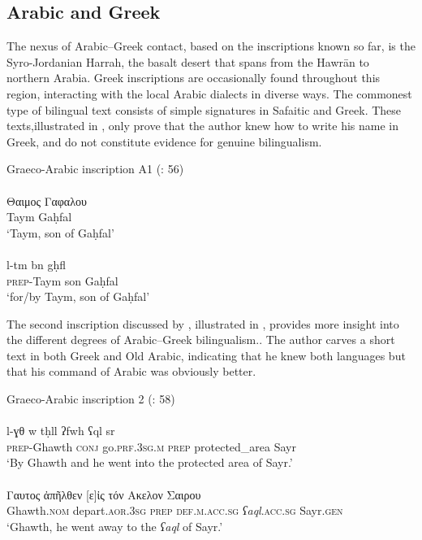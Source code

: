 \documentclass[output=paper]{langsci/langscibook}
\begin{document}
\subsection{Arabic and Greek}
The nexus of Arabic--Greek contact, based on the inscriptions known so far, is the Syro-Jordanian Harrah, the basalt desert that spans from the Hawrān to northern Arabia. Greek inscriptions are occasionally found throughout this region, interacting with the local Arabic dialects in diverse ways. The commonest type of bilingual text consists of simple signatures in Safaitic and Greek. These texts,\linebreak illustrated in , only prove that the author knew how to write his name in Greek, and do not constitute evidence for genuine bilingualism. 

\ea Graeco-Arabic inscription A1 (\citealt{Al-Jalladal-Manaser2016}: 56)\label{Taym}\\
 \\ 
\gll    Θαιμος Γαφαλου \\
        Taym Gaḥfal\\
\glt `Taym, son of Gaḥfal'\\

 \\
\gll   l-tm bn gḥfl \\
       \textsc{prep}-Taym son Gaḥfal \\
\glt `for/by Taym, son of Gaḥfal'\\
\z
\z

 The second inscription discussed by \citet{Al-Jalladal-Manaser2016}, illustrated in , provides more insight into the different degrees of Arabic--Greek bilingualism.. The author carves a short text in both Greek and Old Arabic, indicating that he knew both languages but that his command of Arabic was obviously better.

\ea Graeco-Arabic inscription 2 (\citealt{Al-Jalladal-Manaser2016}: 58)\label{Ghawth}\\
 \\
\gll   l-ɣθ w tḥll ʔfwh ʕql sr \\
       \textsc{prep}-Ghawth \textsc{conj} go.\textsc{prf.3sg.m} \textsc{prep} protected\_area Sayr\\
\glt `By Ghawth and he went into the protected area of Sayr.'\\
 \\ 
\gll    Γαυτος ἀπῆλθεν [ε]ἰς τόν Ακελον Σαιρου\\
Ghawth.\textsc{nom} depart.\textsc{aor.3sg} \textsc{prep} \textsc{def.m.acc.sg} \textit{ʕaql}.\textsc{acc.sg} Sayr.\textsc{gen}\\ 
\glt `Ghawth, he went away to the \textit{ʕaql} of Sayr.'\\
\z
\z
\end{document}
